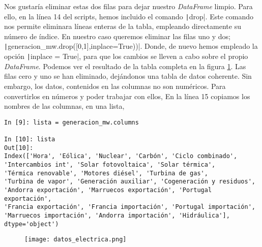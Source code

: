 \begin{paracol}{2}
Nos gustaría eliminar estas dos filas para dejar nuestro \emph{DataFrame} limpio. Para ello, en la línea 14 del scripts, hemos incluido el comando \texttt|drop|. Este comando nos permite eliminara líneas enteras de la tabla, empleando directamente su número de índice. En nuestro caso queremos eliminar las filas uno y dos; \texttt|generacion_mw.drop([0,1],inplace=True))|. Donde, de nuevo hemos empleado la opción \texttt|inplace = True|, para que los cambios se lleven a cabo sobre el propio 	\emph{DataFrame}. 
Podemos ver el resultado de la tabla completa en la figura \ref{fig:dataf}. Las filas cero y uno se han eliminado, dejándonos una tabla de datos coherente. 
Sin embargo, los datos, contenidos en las columnas no son numéricos. Para convertirlos en números y poder trabajar con ellos,
En la línea 15 copiamos los nombres de las columnas, en una lista, 
\end{paracol}

\begin{center}
	\begin{minipage}{0.7\textwidth}
		\begin{verbatim}
In [9]: lista = generacion_mw.columns

In [10]: lista
Out[10]: 
Index(['Hora', 'Eólica', 'Nuclear', 'Carbón', 'Ciclo combinado',
'Intercambios int', 'Solar fotovoltaica', 'Solar térmica',
'Térmica renovable', 'Motores diésel', 'Turbina de gas',
'Turbina de vapor', 'Generación auxiliar', 'Cogeneración y residuos',
'Andorra exportación', 'Marruecos exportación', 'Portugal exportación',
'Francia exportación', 'Francia importación', 'Portugal importación',
'Marruecos importación', 'Andorra importación', 'Hidráulica'],
dtype='object')									 	
		\end{verbatim}
	\end{minipage}
\end{center}

\begin{figure}
	\centering
	\texttt{[image: datos\_electrica.png]}
	\label{fig:dataf}
\end{figure}

